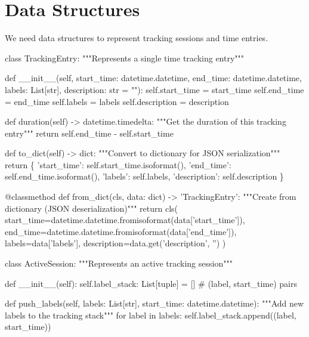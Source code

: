 \section{Data Structures}

We need data structures to represent tracking sessions and time entries.

\nwenddocs{}\endmoddef\nwstartdeflinemarkup{}\nwenddeflinemarkup
class TrackingEntry:
    """Represents a single time tracking entry"""
    
    def __init__(self, start_time: datetime.datetime, end_time: datetime.datetime, 
                 labels: List[str], description: str = ""):
        self.start_time = start_time
        self.end_time = end_time
        self.labels = labels
        self.description = description
        
    def duration(self) -> datetime.timedelta:
        """Get the duration of this tracking entry"""
        return self.end_time - self.start_time
        
    def to_dict(self) -> dict:
        """Convert to dictionary for JSON serialization"""
        return \{
            'start_time': self.start_time.isoformat(),
            'end_time': self.end_time.isoformat(),
            'labels': self.labels,
            'description': self.description
        \}
    
    @classmethod
    def from_dict(cls, data: dict) -> 'TrackingEntry':
        """Create from dictionary (JSON deserialization)"""
        return cls(
            start_time=datetime.datetime.fromisoformat(data['start_time']),
            end_time=datetime.datetime.fromisoformat(data['end_time']),
            labels=data['labels'],
            description=data.get('description', '')
        )

class ActiveSession:
    """Represents an active tracking session"""
    
    def __init__(self):
        self.label_stack: List[tuple] = []  # (label, start_time) pairs
        
    def push_labels(self, labels: List[str], start_time: datetime.datetime):
        """Add new labels to the tracking stack"""
        for label in labels:
            self.label_stack.append((label, start_time))
    
